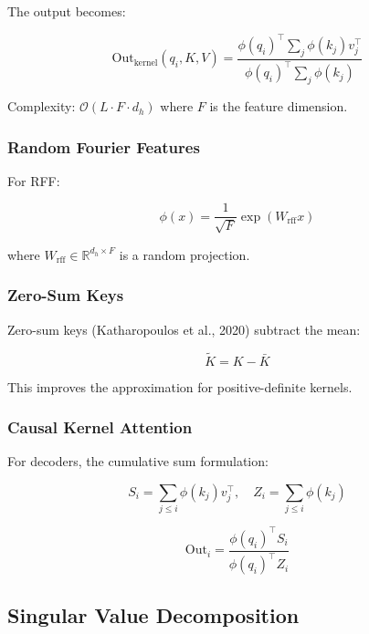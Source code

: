 The output becomes:

\begin{equation}
\text{Out}_\text{kernel}(q_i, K, V) = \frac{\phi(q_i)^\top \sum_j \phi(k_j) v_j^\top}{\phi(q_i)^\top \sum_j \phi(k_j)}
\end{equation}

Complexity: $\mathcal{O}(L \cdot F \cdot d_h)$ where $F$ is the feature 
dimension.

\subsubsection{Random Fourier Features}

For RFF:

\begin{equation}
\phi(x) = \frac{1}{\sqrt{F}} \exp\!\left(W_\text{rff} x\right)
\end{equation}

where $W_\text{rff} \in \mathbb{R}^{d_h \times F}$ is a random projection.

\subsubsection{Zero-Sum Keys}

Zero-sum keys (Katharopoulos et al., 2020) subtract the mean:

\begin{equation}
\tilde{K} = K - \bar{K}
\end{equation}

This improves the approximation for positive-definite kernels.

\subsubsection{Causal Kernel Attention}

For decoders, the cumulative sum formulation:

\begin{equation}
S_i = \sum_{j \leq i} \phi(k_j) v_j^\top, \quad
Z_i = \sum_{j \leq i} \phi(k_j)
\end{equation}

\begin{equation}
\text{Out}_i = \frac{\phi(q_i)^\top S_i}{\phi(q_i)^\top Z_i}
\end{equation}

\subsection{Singular Value Decomposition}

